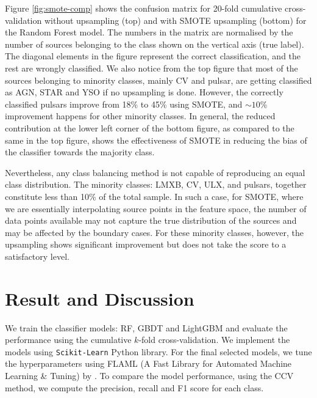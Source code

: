 \documentclass[fleqn,usenatbib]{mnras}
\begin{document}
    Figure \ref{fig:smote-comp} shows the confusion matrix for 20-fold cumulative cross-validation without upsampling (top) and with SMOTE upsampling (bottom) for the Random Forest model. The numbers in the matrix are normalised by the number of sources belonging to the class shown on the vertical axis (true label). The diagonal elements in the figure represent the correct classification, and the rest are wrongly classified. We also notice from the top figure that most of the sources belonging to minority classes, mainly CV and pulsar, are getting classified as AGN, STAR and YSO if no upsampling is done. However, the correctly classified pulsars improve from 18\% to 45\% using SMOTE, and  $\sim 10$\% improvement happens for other minority classes. In general, the reduced contribution at the lower left corner of the bottom figure, as compared to the same in the top figure, shows the effectiveness of SMOTE in reducing the bias of the classifier towards the majority class.
    
    Nevertheless, any class balancing method is not capable of reproducing an equal class distribution. The minority classes: LMXB, CV, ULX, and pulsars, together constitute less than 10\% of the total sample. In such a case, for SMOTE, where we are essentially interpolating source points in the feature space, the number of data points available may not capture the true distribution of the sources and may be affected by the boundary cases. For these minority classes, however, the upsampling shows significant improvement but does not take the score to a satisfactory level.
    
\section{Result and Discussion}\label{sec:result}
    We train the classifier models: RF, GBDT and LightGBM and evaluate the performance using the cumulative $k$-fold cross-validation. We implement the models using \texttt{Scikit-Learn} Python library. For the final selected models, we tune the hyperparameters using FLAML (A Fast Library for Automated Machine Learning \& Tuning) by \cite{2019arXiv191104706W}. To compare the model performance, using the CCV method, we compute the precision, recall and F1 score for each class.
\end{document}
